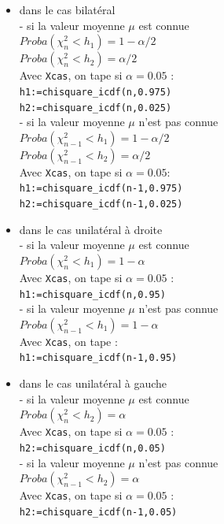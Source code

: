 \documentclass[a4paper,11pt]{book}
\begin{document}
\begin{itemize} 
\item dans le cas  bilat\'eral\\
- si la valeur moyenne $\mu$ est connue\\
$Proba(\chi^2_n<h_1)=1-\alpha/2$\\
$Proba(\chi^2_n<h_2)=\alpha/2$\\
Avec {\tt Xcas}, on tape  si $\alpha=0.05$ :\\
{\tt h1:=chisquare\_icdf(n,0.975)}\\
{\tt h2:=chisquare\_icdf(n,0.025)}\\
- si la valeur moyenne $\mu$  n'est pas connue\\
$Proba(\chi^2_{n-1}<h_1)=1-\alpha/2$\\
$Proba(\chi^2_{n-1}<h_2)=\alpha/2$\\
Avec {\tt Xcas}, on tape  si $\alpha=0.05$:\\
{\tt h1:=chisquare\_icdf(n-1,0.975)}\\
{\tt h2:=chisquare\_icdf(n-1,0.025)}\\
\item dans le cas  unilat\'eral \`a droite\\ 
- si la valeur moyenne $\mu$ est connue\\
$Proba(\chi^2_n<h_1)=1-\alpha$\\
Avec {\tt Xcas}, on tape  si $\alpha=0.05$ :\\
{\tt h1:=chisquare\_icdf(n,0.95)}\\
- si la valeur moyenne $\mu$ n'est pas connue\\
$Proba(\chi^2_{n-1}<h_1)=1-\alpha$\\
Avec {\tt Xcas}, on tape :\\
{\tt h1:=chisquare\_icdf(n-1,0.95)}\\
\item dans le cas  unilat\'eral \`a gauche\\
- si la valeur moyenne $\mu$ est connue\\
$Proba(\chi^2_n<h_2)=\alpha$\\
Avec {\tt Xcas}, on tape  si $\alpha=0.05$ :\\
{\tt h2:=chisquare\_icdf(n,0.05)}\\
- si la valeur moyenne $\mu$ n'est pas connue\\
$Proba(\chi^2_{n-1}<h_2)=\alpha$\\
Avec {\tt Xcas}, on tape  si $\alpha=0.05$ :\\
{\tt h2:=chisquare\_icdf(n-1,0.05)}
\end{itemize}
\end{document}
